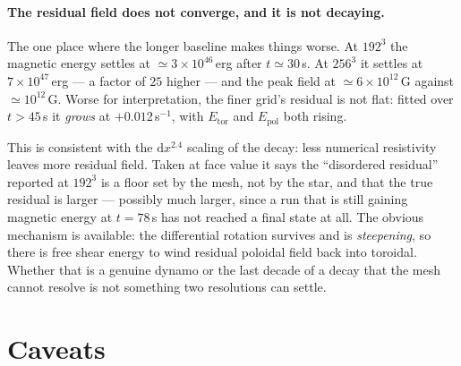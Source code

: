 \documentclass[11pt,a4paper]{article}
\newcommand{\Etor}{E_{\mathrm{tor}}}
\newcommand{\Epol}{E_{\mathrm{pol}}}
\begin{document}
\paragraph{The residual field does not converge, and it is not decaying.} The
one place where the longer baseline makes things worse. At $192^3$ the magnetic
energy settles at $\simeq 3\times10^{46}$\,erg after $t \simeq 30$\,s. At
$256^3$ it settles at $7\times10^{47}$\,erg --- a factor of $25$ higher --- and
the peak field at $\simeq 6\times10^{12}$\,G against $\simeq 10^{12}$\,G.
Worse for interpretation, the finer grid's residual is not flat: fitted over
$t > 45$\,s it \emph{grows} at $+0.012$\,s$^{-1}$, with $\Etor$ and $\Epol$
both rising.

This is consistent with the $\mathrm{d}x^{2.4}$ scaling of the decay: less
numerical resistivity leaves more residual field. Taken at face value it says
the ``disordered residual'' reported at $192^3$ is a floor set by the mesh, not
by the star, and that the true residual is larger --- possibly much larger,
since a run that is still gaining magnetic energy at $t = 78$\,s has not
reached a final state at all. The obvious mechanism is available: the
differential rotation survives and is \emph{steepening}, so there is free shear
energy to wind residual poloidal field back into toroidal. Whether that is a
genuine dynamo or the last decade of a decay that the mesh cannot resolve is
not something two resolutions can settle.

\section{Caveats}
\label{sec:caveats}
\end{document}
